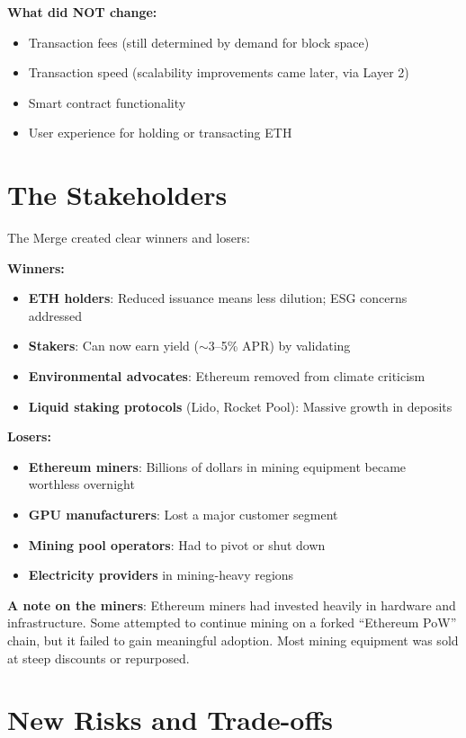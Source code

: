 \documentclass[11pt]{article}
\begin{document}
\medskip
\noindent\textbf{What did NOT change:}
\begin{itemize}[leftmargin=*]
\item Transaction fees (still determined by demand for block space)
\item Transaction speed (scalability improvements came later, via Layer 2)
\item Smart contract functionality
\item User experience for holding or transacting ETH
\end{itemize}

\section*{The Stakeholders}

The Merge created clear winners and losers:

\medskip
\noindent\textbf{Winners:}
\begin{itemize}[leftmargin=*]
\item \textbf{ETH holders}: Reduced issuance means less dilution; ESG concerns addressed
\item \textbf{Stakers}: Can now earn yield ($\sim$3--5\% APR) by validating
\item \textbf{Environmental advocates}: Ethereum removed from climate criticism
\item \textbf{Liquid staking protocols} (Lido, Rocket Pool): Massive growth in deposits
\end{itemize}

\medskip
\noindent\textbf{Losers:}
\begin{itemize}[leftmargin=*]
\item \textbf{Ethereum miners}: Billions of dollars in mining equipment became worthless overnight
\item \textbf{GPU manufacturers}: Lost a major customer segment
\item \textbf{Mining pool operators}: Had to pivot or shut down
\item \textbf{Electricity providers} in mining-heavy regions
\end{itemize}

\medskip
\noindent\textbf{A note on the miners}: Ethereum miners had invested heavily in hardware and infrastructure. Some attempted to continue mining on a forked ``Ethereum PoW'' chain, but it failed to gain meaningful adoption. Most mining equipment was sold at steep discounts or repurposed.

\section*{New Risks and Trade-offs}
\end{document}
